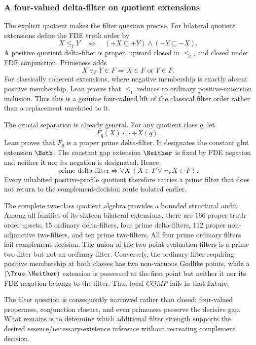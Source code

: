 \subsubsection{A four-valued delta-filter on quotient extensions}

The explicit quotient makes the filter question precise. For bilateral quotient extensions define the FDE truth order by
\[
  X\leq_tY
  \quad\Longleftrightarrow\quad
  (+X\subseteq+Y)\land(-Y\subseteq-X).
\]
A positive quotient delta-filter is proper, upward closed in \(\leq_t\), and closed under FDE conjunction. Primeness adds
\[
  X\vee_FY\in F\Longrightarrow X\in F\text{ or }Y\in F.
\]
For classically coherent extensions, where negative membership is exactly absent positive membership, Lean proves that \(\leq_t\) reduces to ordinary positive-extension inclusion. Thus this is a genuine four-valued lift of the classical filter order rather than a replacement unrelated to it.

The crucial separation is already general. For any quotient class \(q\), let
\[
  F_q(X)\Longleftrightarrow +X(q).
\]
Lean proves that \(F_q\) is a proper prime delta-filter. It designates the constant glut extension \(\Both\). The constant gap extension \(\Neither\) is fixed by FDE negation and neither it nor its negation is designated. Hence
\[
\boxed{
  \text{prime delta-filter}
  \not\Longrightarrow
  \forall X\,(X\in F\lor\neg_FX\in F).
}
\]
Every inhabited positive-profile quotient therefore carries a prime filter that does not return to the complement-decision route isolated earlier.

The complete two-class quotient algebra provides a bounded structural audit. Among all families of its sixteen bilateral extensions, there are 166 proper truth-order upsets, 15 ordinary delta-filters, four prime delta-filters, 112 proper non-adjunctive two-filters, and ten prime two-filters. All four prime ordinary filters fail complement decision. The union of the two point-evaluation filters is a prime two-filter but not an ordinary filter. Conversely, the ordinary filter requiring positive membership at both classes has two non-vacuous Godlike points, while a \((\True,\Neither)\) extension is possessed at the first point but neither it nor its FDE negation belongs to the filter. Thus local \(COMP\) fails in that fixture.

The filter question is consequently narrowed rather than closed: four-valued properness, conjunction closure, and even primeness preserve the decisive gap. What remains is to determine which additional filter strength supports the desired essence/necessary-existence inference without recreating complement decision.
